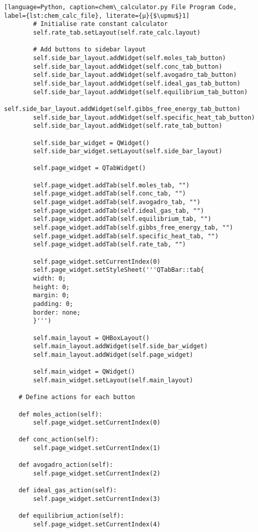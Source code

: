 \begin{lstlisting}[language=Python, caption=chem\_calculator.py File Program Code, label={lst:chem_calc_file}, literate={μ}{$\upmu$}1]
        # Initialise rate constant calculator
        self.rate_tab.setLayout(self.rate_calc.layout)

        # Add buttons to sidebar layout
        self.side_bar_layout.addWidget(self.moles_tab_button)
        self.side_bar_layout.addWidget(self.conc_tab_button)
        self.side_bar_layout.addWidget(self.avogadro_tab_button)
        self.side_bar_layout.addWidget(self.ideal_gas_tab_button)
        self.side_bar_layout.addWidget(self.equilibrium_tab_button)
        self.side_bar_layout.addWidget(self.gibbs_free_energy_tab_button)
        self.side_bar_layout.addWidget(self.specific_heat_tab_button)
        self.side_bar_layout.addWidget(self.rate_tab_button)

        self.side_bar_widget = QWidget()
        self.side_bar_widget.setLayout(self.side_bar_layout)

        self.page_widget = QTabWidget()

        self.page_widget.addTab(self.moles_tab, "")
        self.page_widget.addTab(self.conc_tab, "")
        self.page_widget.addTab(self.avogadro_tab, "")
        self.page_widget.addTab(self.ideal_gas_tab, "")
        self.page_widget.addTab(self.equilibrium_tab, "")
        self.page_widget.addTab(self.gibbs_free_energy_tab, "")
        self.page_widget.addTab(self.specific_heat_tab, "")
        self.page_widget.addTab(self.rate_tab, "")

        self.page_widget.setCurrentIndex(0)
        self.page_widget.setStyleSheet('''QTabBar::tab{
        width: 0; 
        height: 0; 
        margin: 0; 
        padding: 0; 
        border: none;
        }''')

        self.main_layout = QHBoxLayout()
        self.main_layout.addWidget(self.side_bar_widget)
        self.main_layout.addWidget(self.page_widget)

        self.main_widget = QWidget()
        self.main_widget.setLayout(self.main_layout)

    # Define actions for each button

    def moles_action(self):
        self.page_widget.setCurrentIndex(0)

    def conc_action(self):
        self.page_widget.setCurrentIndex(1)

    def avogadro_action(self):
        self.page_widget.setCurrentIndex(2)

    def ideal_gas_action(self):
        self.page_widget.setCurrentIndex(3)

    def equilibrium_action(self):
        self.page_widget.setCurrentIndex(4)


\end{lstlisting}
